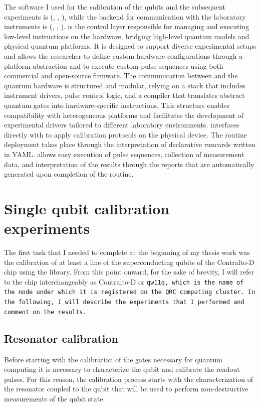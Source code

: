 The software I used for the calibration of the qubits and the subsequent experiments is \Qibocal (\cite{pasquale_qibocal_2024}, \cite{qibocalscience}, \cite{qibocalgit}), while the backend for communication with the laboratory instruments is \Qibolab (\cite{efthymiou_qibolab_2024}, \cite{qibolabscience}, \cite{qibolabgit}).
\Qibolab is the control layer responsible for managing and executing low-level instructions on the hardware, bridging high-level quantum models and physical quantum platforms.
It is designed to support diverse experimental setups and allows the researcher to define custom hardware configurations through a platform abstraction and to execute custom pulse sequences using both commercial and open-source firmware.
The communication between \Qibolab and the quantum hardware is structured and modular, relying on a stack that includes instrument drivers, pulse control logic, and a compiler that translates abstract quantum gates into hardware-specific instructions.
This structure enables compatibility with heterogeneous platforms and facilitates the development of experimental drivers tailored to different laboratory environments.
\Qibocal interfaces directly with \Qibolab to apply calibration protocols on the physical device. The routine deployment takes place through the interpretation of declarative runcards written in YAML.
\Qibocal allows easy execution of pulse sequences, collection of measurement data, and interpretation of the results through the reports that are automatically generated upon completion of the routine.

\section{Single qubit calibration experiments}\label{sec:calibration}

The first task that I needed to complete at the beginning of my thesis work was the calibration of at least a line of the superconducting qubits of the Contralto-D chip using the \Qibocal library.
From this point onward, for the sake of brevity, I will refer to the chip interchangeably as Contralto-D or \tt{qw11q}, which is the name of the node under which it is registered on the QRC computing cluster.
In the following, I will describe the experiments that I performed and comment on the results.

\subsection{Resonator calibration}
Before starting with the calibration of the gates necessary for quantum computing it is necessary to characterize the qubit and calibrate the readout pulses. 
For this reason, the calibration process starts with the characterization of the resonator coupled to the qubit that will be used to perform non-destructive measurements of the qubit state.

